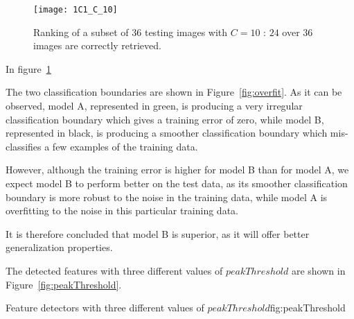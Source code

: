 \documentclass{article}
\begin{document}
\begin{figure}[ht!]
	\centering
	\texttt{[image: 1C1\_C\_10]}
	\caption{Ranking of a subset of 36 testing images with \( C = 10\) : \(24\) over \(36\) images are correctly retrieved.}
	\label{fig_1C1_10}
\end{figure}

In figure~\ref{fig_1C1_10}

\clearpage

The two classification boundaries are shown in Figure~\ref{fig:overfit}. As it can be observed, model A, represented in green, is producing a very irregular classification boundary which gives a training error of zero, while model B, represented in black, is producing a smoother classification boundary which mis-classifies a few examples of the training data.

However, although the training error is higher for model B than for model A, we expect model B to perform better on the test data, as its smoother classification boundary is more robust to the noise in the training data, while model A is overfitting to the noise in this particular training data.

It is therefore concluded that model B is superior, as it will offer better generalization properties.



The detected features with three different values of $peakThreshold$ are shown in Figure~\ref{fig:peakThreshold}. %

{}
{}
{Feature detectors with three different values of $peakThreshold$}{fig:peakThreshold}
\end{document}
